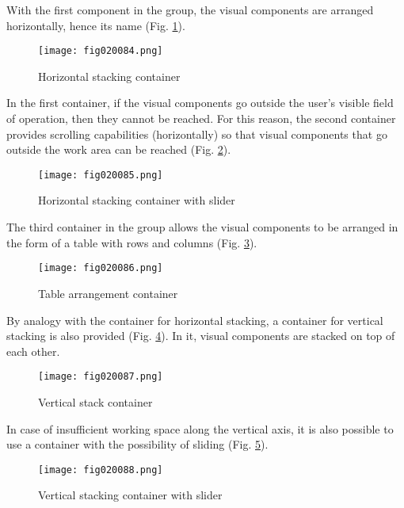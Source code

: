 With the first component in the group, the visual components are arranged horizontally, hence its name (Fig. \ref{fig020084}).

\begin{figure}[H]
   \centering
   \texttt{[image: fig020084.png]}
   \caption{Horizontal stacking container}
\label{fig020084}
\end{figure}

In the first container, if the visual components go outside the user's visible field of operation, then they cannot be reached. For this reason, the second container provides scrolling capabilities (horizontally) so that visual components that go outside the work area can be reached (Fig. \ref{fig020085}).

\begin{figure}[H]
   \centering
   \texttt{[image: fig020085.png]}
   \caption{Horizontal stacking container with slider}
\label{fig020085}
\end{figure}

The third container in the group allows the visual components to be arranged in the form of a table with rows and columns (Fig. \ref{fig020086}).

\begin{figure}[H]
   \centering
   \texttt{[image: fig020086.png]}
   \caption{Table arrangement container}
\label{fig020086}
\end{figure}

By analogy with the container for horizontal stacking, a container for vertical stacking is also provided (Fig. \ref{fig020087}). In it, visual components are stacked on top of each other.

\begin{figure}[H]
   \centering
   \texttt{[image: fig020087.png]}
   \caption{Vertical stack container}
\label{fig020087}
\end{figure}

In case of insufficient working space along the vertical axis, it is also possible to use a container with the possibility of sliding (Fig. \ref{fig020088}).

\begin{figure}[H]
   \centering
   \texttt{[image: fig020088.png]}
   \caption{Vertical stacking container with slider}
\label{fig020088}
\end{figure}

